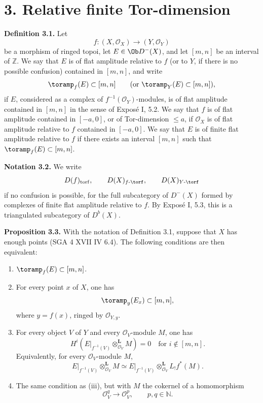 \documentclass[11pt]{article}
\begin{document}
\section*{3. Relative finite Tor-dimension}

\textbf{Definition 3.1.} Let
\[
  f:(X,\mathcal O_X)\longrightarrow (Y,\mathcal O_Y)
\]
be a morphism of ringed topoi, let \(E\in\Ob D^{-}(X)\), and let \([m,n]\) be an interval of \(\mathbb Z\). We say that \(E\) is of flat amplitude relative to \(f\) (or to \(Y\), if there is no possible confusion) contained in \([m,n]\), and write
\[
  \toramp_f(E)\subset [m,n]\qquad(\text{or }\toramp_Y(E)\subset [m,n]),
\]
if \(E\), considered as a complex of \(f^{-1}(\mathcal O_Y)\)-modules, is of flat amplitude contained in \([m,n]\) in the sense of Exposé I, 5.2. We say that \(f\) is of flat amplitude contained in \([-a,0]\), or of Tor-dimension \(\leq a\), if \(\mathcal O_X\) is of flat amplitude relative to \(f\) contained in \([-a,0]\). We say that \(E\) is of finite flat amplitude relative to \(f\) if there exists an interval \([m,n]\) such that \(\toramp_f(E)\subset[m,n]\).

\textbf{Notation 3.2.} We write
\[
  D(f)_{\mathrm{torf}},\qquad D(X)_{f\text{-}\torf},\qquad D(X)_{Y\text{-}\torf}
\]
if no confusion is possible, for the full subcategory of \(D^{-}(X)\) formed by complexes of finite flat amplitude relative to \(f\). By Exposé I, 5.3, this is a triangulated subcategory of \(D^b(X)\).

\textbf{Proposition 3.3.} With the notation of Definition 3.1, suppose that \(X\) has enough points (SGA 4 XVII IV 6.4). The following conditions are then equivalent:
\begin{enumerate}[label=(\roman*)]
\item \(\toramp_f(E)\subset[m,n]\).
\item For every point \(x\) of \(X\), one has
\[
  \toramp_y(E_x)\subset[m,n],
\]
where \(y=f(x)\), ringed by \(\mathcal O_{Y,y}\).
\item For every object \(V\) of \(Y\) and every \(\mathcal O_V\)-module \(M\), one has
\[
  H^i\left(E\vert_{f^{-1}(V)}
  \otimes_{\mathcal O_V}^{\mathbf L}M\right)=0
  \quad\text{for }i\notin[m,n].
\]
Equivalently, for every \(\mathcal O_V\)-module \(M\),
\[
  E\vert_{f^{-1}(V)}\otimes_{\mathcal O_V}^{\mathbf L}M
  \simeq E\vert_{f^{-1}(V)}\otimes_{\mathcal O_V}^{\mathbf L}L_!f^*(M).
\]
\item The same condition as (iii), but with \(M\) the cokernel of a homomorphism
\[
  \mathcal O_V^q\longrightarrow \mathcal O_V^p,
  \qquad p,q\in\mathbb N.
\]
\end{enumerate}
\end{document}

